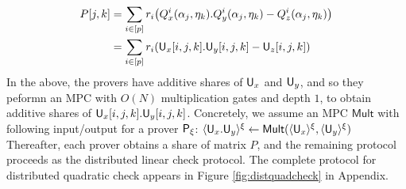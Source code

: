 {\footnotesize 
\begin{align*}
P[j,k] & =\sum_{i\in
[p]}r_i\big(Q_x^i(\alpha_j,\eta_k).Q_y^i(\alpha_j,\eta_k)-Q_z^i(\alpha_j,\eta_k)\big)\\    
& = \sum_{i\in [p]}r_i(\mathsf{U}_x[i,j,k].\mathsf{U}_y[i,j,k] - \mathsf{U}_z[i,j,k])
\end{align*}    
}
In the above, the provers have additive shares of $\mathsf{U}_x$ and
$\mathsf{U}_y$, and so they peformn an MPC with $O(N)$ multiplication gates and
depth $1$, to obtain additive shares of $\mathsf{U}_x[i,j,k].\mathsf{U}_y[i,j,k]$.
Concretely, we assume an MPC $\mathsf{Mult}$ with following input/output for
a prover $\mathsf{P}_\xi$:     
$\langle{\mathsf{U}_x.\mathsf{U}_y}\rangle^\xi\leftarrow \mathsf{Mult}(\langle{\mathsf{U}_x}\rangle^\xi,\langle{\mathsf{U}_y}\rangle^\xi)$    
Thereafter, each prover obtains a share of matrix $P$, and the remaining protocol proceeds as
the distributed linear check protocol. 
The complete protocol for
distributed quadratic check appears in Figure \ref{fig:distquadcheck} in
Appendix.
